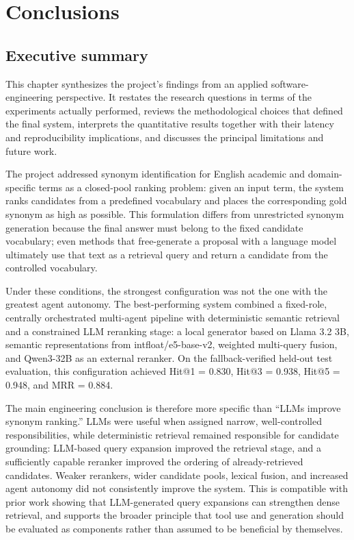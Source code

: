 \chapter{Conclusions}
\label{chap:conclusions}

\section{Executive summary}

This chapter synthesizes the project's findings from an applied software-engineering perspective. It restates the research questions in terms of the experiments actually performed, reviews the methodological choices that defined the final system, interprets the quantitative results together with their latency and reproducibility implications, and discusses the principal limitations and future work.

The project addressed synonym identification for English academic and domain-specific terms as a closed-pool ranking problem: given an input term, the system ranks candidates from a predefined vocabulary and places the corresponding gold synonym as high as possible. This formulation differs from unrestricted synonym generation because the final answer must belong to the fixed candidate vocabulary; even methods that free-generate a proposal with a language model ultimately use that text as a retrieval query and return a candidate from the controlled vocabulary.

Under these conditions, the strongest configuration was not the one with the greatest agent autonomy. The best-performing system combined a fixed-role, centrally orchestrated multi-agent pipeline with deterministic semantic retrieval and a constrained LLM reranking stage: a local generator based on Llama 3.2 3B, semantic representations from intfloat/e5-base-v2, weighted multi-query fusion, and Qwen3-32B as an external reranker. On the fallback-verified held-out test evaluation, this configuration achieved Hit@1 = 0.830, Hit@3 = 0.938, Hit@5 = 0.948, and MRR = 0.884.

The main engineering conclusion is therefore more specific than ``LLMs improve synonym ranking.'' LLMs were useful when assigned narrow, well-controlled responsibilities, while deterministic retrieval remained responsible for candidate grounding: LLM-based query expansion improved the retrieval stage, and a sufficiently capable reranker improved the ordering of already-retrieved candidates. Weaker rerankers, wider candidate pools, lexical fusion, and increased agent autonomy did not consistently improve the system. This is compatible with prior work showing that LLM-generated query expansions can strengthen dense retrieval, and supports the broader principle that tool use and generation should be evaluated as components rather than assumed to be beneficial by themselves.

